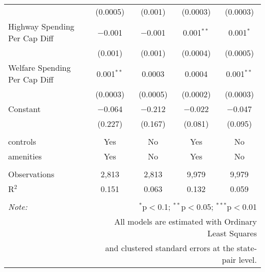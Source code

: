 \begin{table}[!htbp]
\begin{tabular}{@{\extracolsep{5pt}}lcccc}
  & (0.0005) & (0.001) & (0.0003) & (0.0003) \\ 
  Highway Spending Per Cap Diff & $-$0.001 & $-$0.001 & 0.001$^{**}$ & 0.001$^{*}$ \\ 
  & (0.001) & (0.001) & (0.0004) & (0.0005) \\ 
  Welfare Spending Per Cap Diff & 0.001$^{**}$ & 0.0003 & 0.0004 & 0.001$^{**}$ \\ 
  & (0.0003) & (0.0005) & (0.0002) & (0.0003) \\ 
  Constant & $-$0.064 & $-$0.212 & $-$0.022 & $-$0.047 \\ 
  & (0.227) & (0.167) & (0.081) & (0.095) \\ 
 \hline \\[-1.8ex] 
controls & Yes & No & Yes & No \\ 
amenities & Yes & No & Yes & No \\ 
\hline \\[-1.8ex] 
Observations & 2,813 & 2,813 & 9,979 & 9,979 \\ 
R$^{2}$ & 0.151 & 0.063 & 0.132 & 0.059 \\ 
\hline 
\hline \\[-1.8ex] 
\textit{Note:}  & \multicolumn{4}{r}{$^{*}$p$<$0.1; $^{**}$p$<$0.05; $^{***}$p$<$0.01} \\ 
 & \multicolumn{4}{r}{All models are estimated with Ordinary Least Squares} \\ 
 & \multicolumn{4}{r}{and clustered standard errors at the state-pair level.} \\ 
\end{tabular} 
\end{table} 
